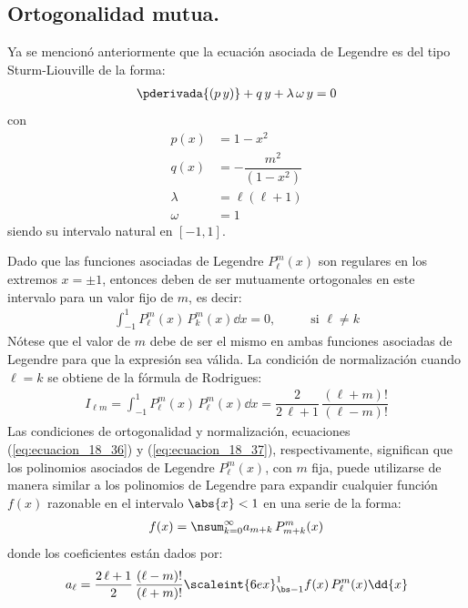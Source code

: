 \subsection{Ortogonalidad mutua.}

Ya se mencionó anteriormente que la ecuación asociada de Legendre es del tipo Sturm-Liouville de la forma:
\begin{align*}
\pderivada{(p \, y)} + q \, y + \lambda \,  \omega \, y = 0
\end{align*}
con
\begin{align*}
p (x) &= 1 - x^{2} \\[0.5em]
q (x) &= - \dfrac{m^{2}}{(1 - x^{2})} \\[0.5em]
\lambda &= \ell (\ell + 1) \\[0.5em]
\omega &= 1
\end{align*}
siendo su intervalo natural en $[-1, 1]$.
\par
Dado que las funciones asociadas de Legendre $P_{\ell}^{m} (x)$ son regulares en los extremos $x = \pm 1$, entonces deben de ser mutuamente ortogonales en este intervalo para un valor fijo de $m$, es decir:
\begin{align}
\int_{-1}^{1} P_{\ell}^{m} (x) \, P_{k}^{m} (x) \dd{x}  = 0, \hspace{1cm} \mbox{ si } \ell \neq	 k
\label{eq:ecuacion_18_36}
\end{align}
Nótese que el valor de $m$ debe de ser el mismo en ambas funciones asociadas de Legendre para que la expresión sea válida. La condición de normalización cuando $\ell = k$ se obtiene de la fórmula de Rodrigues:
\begin{align}
I_{\ell m} = \int_{-1}^{1} P_{\ell}^{m} (x) \, P_{\ell}^{m} (x) \dd{x} = \dfrac{2}{2 \, \ell + 1} \, \dfrac{(\ell + m)!}{( \ell - m)!}
\label{eq:ecuacion_18_37}
\end{align}
Las condiciones de ortogonalidad y normalización, ecuaciones (\ref{eq:ecuacion_18_36}) y (\ref{eq:ecuacion_18_37}), respectivamente, significan que los polinomios asociados de Legendre $P_{\ell}^{m} (x)$, con $m$ fija, puede utilizarse de manera similar a los polinomios de Legendre para expandir cualquier función $f (x)$ razonable en el intervalo $\abs{x} < 1$ en una serie de la forma:
\begin{align}
f (x) = \nsum_{k=0}^{\infty} a_{m+k} \, P_{m+k}^{m} (x)
\label{eq:ecuacion_18_38}
\end{align}
donde los coeficientes están dados por:
\begin{align*}
a_{\ell} = \dfrac{2 \, \ell + 1}{2} \, \dfrac{(\ell - m)!}{(\ell + m)!} \scaleint{6ex}_{\bs -1}^{1} f(x) \, P_{\ell}^{m} (x) \dd{x}
\end{align*}

